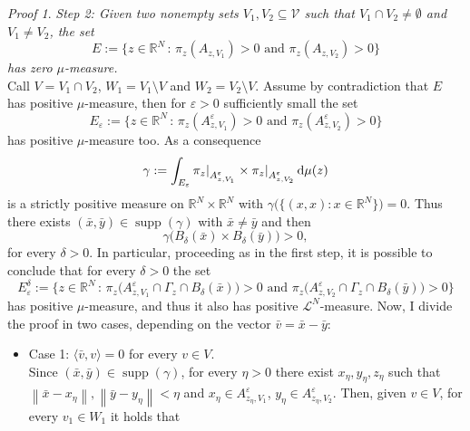\documentclass[11pt,twoside,a4paper]{article}
\DeclareMathOperator{\supp}{supp}
\newcommand{\scal}[2]{\ensuremath{\langle #1 , #2 \rangle}} %
\newcommand{\norm}[1]{\left\lVert#1\right\rVert}
\newcommand{\Leb}{\mathscr{L}}
\newcommand{\R}{\mathbb{R}}
\newcommand{\de}{\ensuremath{\, \mathrm d}} %
\newcommand{\suchthat}{\ensuremath{\,:\,}} %
\newcommand\restr[2]{{%
  \left.\kern-\nulldelimiterspace %
  #1 %
  \right|_{#2} %
  }}
\newcommand{\thmsymbol}{\( \square \)}
\theoremstyle{theorem}
\theoremstyle{definition}
\theoremstyle{remark}
\theoremstyle{proof}
\newtheorem*{pro}{Proof}
\newenvironment{pr}{\begin{pro}%
 \renewcommand{\qedsymbol}{\thmsymbol}\pushQED{\qed}}%
 {\popQED\end{pro}}
\begin{document}
\begin{pr}
\noindent \textit{Step 2: Given two nonempty sets $V_1, V_2 \subseteq \mathcal V$ such that $V_1 \cap V_2 \ne \emptyset$ and $V_1 \ne V_2$, the set
\begin{equation*}
    E:= \big\{z\in \R^N \suchthat \pi_z(A_{z,V_1})>0 \text{ and } \pi_z(A_{z,V_2})>0 \big\}
\end{equation*}
has zero $\mu$-measure.}\\
 Call $V=V_1 \cap V_2$, $W_1=V_1 \setminus V$ and $W_2=V_2 \setminus V$. Assume by contradiction that $E$ has positive $\mu$-measure, then for $\varepsilon>0$ sufficiently small the set
\begin{equation*}
    E_\varepsilon:= \big\{z\in \R^N \suchthat \pi_z(A_{z,V_1}^\varepsilon)>0 \text{ and } \pi_z(A_{z,V_2}^\varepsilon)>0 \big\}
\end{equation*}
has positive $\mu$-measure too. As a consequence 
\begin{equation*}
    \gamma:= \int_{E_\varepsilon} \restr{\pi_z}{A_{z,V_1}^\varepsilon} \times \restr{\pi_z}{A_{z,V_2}^\varepsilon} \de \mu (z)
\end{equation*}
is a strictly positive measure on $\R^N\times\R^N$ with $\gamma \big(\big\{(x,x):x\in \R^N\big\}\big)=0$. Thus there exists $(\bar x, \bar y)\in \supp(\gamma)$ with $\bar x \ne \bar y$ and then 
\begin{equation*}
    \gamma \big( B_{\delta}(\bar x)\times B_{\delta}(\bar y)\big) >0,
\end{equation*}
for every $\delta>0$. In particular, proceeding as in the first step, it is possible to conclude that for every $\delta>0$ the set  
\begin{equation*}
    E_\varepsilon^\delta:= \big\{z\in \R^N \suchthat \pi_z\big(A_{z,V_1}^\varepsilon \cap \Gamma_z \cap B_{\delta}(\bar x)\big)>0 \text{ and } \pi_z\big(A_{z,V_2}^\varepsilon \cap \Gamma_z\cap B_{\delta}(\bar y)\big)>0 \big\}
\end{equation*}
has positive $\mu$-measure, and thus it also has positive $\Leb^N$-measure. Now, I divide the proof in two cases, depending on the vector $\bar v = \bar x-\bar y$:
\begin{itemize}
    \item Case 1: $\scal{\bar v}{v}=0$ for every $v \in V$.\\
    Since $(\bar x,\bar y)\in \supp (\gamma)$, for every $\eta>0$ there exist $x_\eta,y_\eta, z_\eta$ such that $\norm{\bar x - x_\eta},\norm{\bar y - y_\eta}<\eta$ and $x_\eta \in A_{z_\eta,V_1}^\varepsilon$, $y_\eta \in A_{z_\eta,V_2}^\varepsilon$. Then, given $v\in V$, for every $v_1\in W_1$ it holds that 

\end{itemize}
\end{pr}
\end{document}

